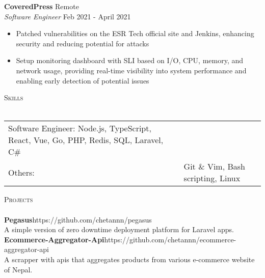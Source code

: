\documentclass[a4paper]{article}
\newcommand{\lineunder} {
    \vspace*{-8pt} \\
    \hspace*{-18pt} \hrulefill \\
}
\newcommand{\header} [1] {
    {\hspace*{-18pt}\vspace*{6pt} \textsc{#1}}
    \vspace*{-6pt} \lineunder
}
\begin{document}
\textbf{CoveredPress} \hfill Remote\\
\textit{Software Engineer} \hfill Feb 2021 - April 2021\\
\vspace{-1mm}
\begin{itemize} \itemsep 1pt
	\item Patched vulnerabilities on the ESR Tech official site and Jenkins, enhancing security and reducing potential for attacks
	\item Setup monitoring dashboard with SLI based on I/O, CPU, memory, and network usage, providing real-time visibility into system performance and enabling early detection of potential issues
\end{itemize}


\header{Skills}
\begin{tabularx}{\textwidth}{ l X } 
	Software Engineer:  Node.js, TypeScript, React, Vue, Go, PHP, Redis, SQL, Laravel, C\#      \\
	Others:     &  Git \& Vim, Bash scripting, Linux  \\
\end{tabularx}
\vspace{2mm}

\header{Projects}
{\textbf{Pegasus}}\hfill https://github.com/chetannn/pegasus\\
A simple version of zero downtime deployment platform for Laravel apps.\\
\vspace*{2mm}
{\textbf{Ecommerce-Aggregator-Api}}\hfill https://github.com/chetannn/ecommerce-aggregator-api\\
A scrapper with apis that aggregates products from various e-commerce website of Nepal.\\
\vspace*{2mm}

\ 
\end{document}
